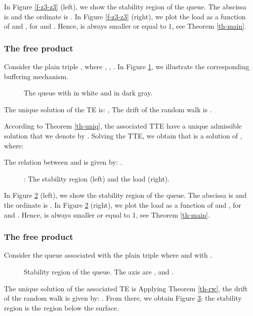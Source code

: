 \documentclass[11pt,a4paper]{article}
\theoremstyle{remark}
\begin{document}
In Figure \ref{f-z3-z3} (left), we show the stability region of
the queue. The abscissa is  and the ordinate is .
In Figure \ref{f-z3-z3} (right), we plot the load  as a
function of  and , for  and
. Hence, 
is always smaller or equal to 1, see Theorem \ref{th-main}.

\subsubsection{The free product }

Consider the plain triple , where ,
, . In Figure \ref{f-n-b}, we illustrate
the corresponding buffering mechanism.

\begin{figure}[ht]

\caption{The queue  with  in white and
 in dark gray.} \label{f-n-b}
\end{figure}

The unique solution  of the TE is:
,  The drift of the
random walk is .

According to Theorem \ref{th-uniq}, the associated TTE have a
unique admissible solution that we denote by . Solving
the TTE, we obtain that  is a solution of , where:


The relation between  and  is given by: .

\begin{figure}[ht]

\caption{: The stability region (left) and
the load  (right).} \label{f-n-b-stab}
\end{figure}


In Figure \ref{f-n-b-stab} (left), we show the stability region of
the queue. The abscissa is  and the ordinate is .
In Figure \ref{f-n-b-stab} (right), we plot the load  as a
function of  and , for  and
. Hence,  is
always smaller or equal to 1, see Theorem \ref{th-main}.

\subsubsection{The free product }

Consider the queue associated with the plain triple  where
 and  with
.

\begin{figure}[ht]

\caption{Stability region of the  queue. The axis are , and . }
\label{f-n-z-b}
\end{figure}

The unique solution  of the associated TE is
 Applying
Theorem \ref{th-rw}, the drift of the random walk is given by:
.
From there, we obtain Figure \ref{f-n-z-b}: the stability region
is the region below the surface.
\end{document}
